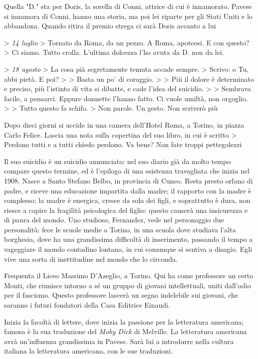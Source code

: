 Quella "D." sta per Doris, la sorella di Conni, attrice di cui è innamorato. Pavese si innamora di Conni, hanno una storia, ma poi lei riparte per gli Stati Uniti e lo abbandona.
Quando ritira il premio strega ci sarà Doris accanto a lui

> \textit{14 luglio}
> Tornato da Roma, da un pezzo. A Roma, apoteosi. E con questo?
> Ci siamo. Tutto crolla. L'ultima dolcezza l'ho avuta da D. non da lei.

> \textit{18 agosto}
> La cosa pià segretamente temuta accade sempre.
> Scrivo: o Tu, abbi pietà. E poi?
>
> Basta un po' di coraggio.
>
> Più il dolore è determinato e preciso, più l'istinto di vita si dibatte, e cade l'idea del suicidio.
>
> Sembrava facile, a pensarci. Eppure donnette l'hanno fatto. Ci vuole umiltà, non orgoglio.
>
> Tutto questo fa schifo.
> Non parole. Un gesto. Non scriverò più

Dopo dieci giorni si uccide in una camera dell'Hotel Roma, a Torino, in piazza Carlo Felice. Lascia una nota sulla copertina del suo libro, in cui è scritto
> Perdono tutti e a tutti chiedo perdono. Va bene? Non fate troppi pettegolezzi

Il suo suicidio è un suicidio annunciato; nel suo diario già da molto tempo compare questo termine, ed è l'epilogo di una esistenza travagliata che inizia nel 1908. Nasce a Santo Stefano Belbo, in provincia di Cuneo.
Resta presto orfano di padre, e riceve una educazione impartita dalla madre; il rapporto con la madre è complesso; la madre è energica, cresce da sola dei figli, e soprattutto è dura, non riesce a capire la fragilità psicologica del figlio: questo causerà una insicurezza e di paura del mondo. 
Uno studioso, Fernandez, vede nel personaggio due personalità: fece le scuole medie a Torino, in una scuola dove studiava l'alta borghesia, dove ha una grandissima difficoltà di inserimento, passando il tempo a vageggiare il mondo contadino lontano, in cui comunque si sentiva a disagio.
Egli vive una sorta di inettitudine nel mondo che lo circonda.

Frequenta il Liceo Massimo D'Azeglio, a Torino. Qui ha come professore un certo Monti, che riunisce intorno a sé un gruppo di giovani intellettuali, uniti dall'odio per il fascismo. Questo professore lascerà un segno indelebile sui giovani, che saranno i futuri fondatori della Casa Editrice Einaudi.

Inizia la facoltà di lettere, dove inizia la passione per la letteratura americana; famosa è la sua traduzione del \textit{Moby Dick} di Melville. La letteratura americana avrà un'influenza grandissima in Pavese.
Sarà lui a introdurre nella cultura italiana la letteratura americana, con le sue traduzioni.

